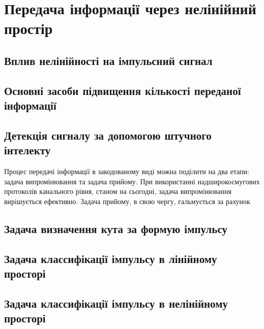 \chapter{Передача інформації через нелінійний простір}
\label{ch:neuron}

\section{Вплив нелінійності на імпульсний сигнал}

\section{Основні засоби підвищення кількості переданої інформації}

\section{Детекція сигналу за допомогою штучного інтелекту}

Процес передачі інформації в закодованому виді можна поділити на два етапи:
задача випромінювання та задача прийому. При використанні надширокосмугових 
протоколів канального рівня, станом на сьогодні, задача випромінювання вирішується 
ефективно. Задача прийому, в свою чергу, гальмується за рахунок 

\section{Задача визначення кута за формую імпульсу}

\section{Задача классифікації імпульсу в лінійному просторі}

\section{Задача классифікації імпульсу в нелінійному просторі}

